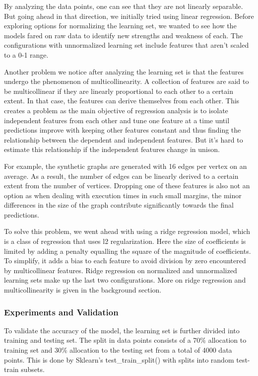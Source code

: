 By analyzing the data points, one can see that they are not linearly separable. But going ahead in that direction, we initially tried using linear regression. Before exploring options for normalizing the learning set, we wanted to see how the models fared on raw data to identify new strengths and weakness of each. The configurations with unnormalized learning set include features that aren't scaled to a 0-1 range.

Another problem we notice after analyzing the learning set is that the features undergo the phenomenon of multicollinearity. A collection of features are said to be multicollinear if they are linearly proportional to each other to a certain extent. In that case, the features can derive themselves from each other. This creates a problem as the main objective of regression analysis is to isolate independent features from each other and tune one feature at a time until predictions improve with keeping other features constant and thus finding the relationship between the dependent and independent features. But it's hard to estimate this relationship if the independent features change in unison. 


For example, the synthetic graphs are generated with 16 edges per vertex on an average. As a result, the number of edges can be linearly derived to a certain extent from the number of vertices. Dropping one of these features is also not an option as when dealing with execution times in such small margins, the minor differences in the size of the graph contribute significantly towards the final predictions.

To solve this problem, we went ahead with using a ridge regression model, which is a class of regression that uses l2 regularization. Here the size of coefficients is limited by adding a penalty equalling the square of the magnitude of coefficients. To simplify, it adds a bias to each feature to avoid division by zero encountered by multicollinear features. Ridge regression on normalized and unnormalized learning sets make up the last two configurations. More on ridge regression and multicollinearity is given in the background section.

\subsubsection{Experiments and Validation}
To validate the accuracy of the model, the learning set is further divided into training and testing set. The split in data points consists of a 70\% allocation to training set and 30\% allocation to the testing set from a total of 4000 data points. This is done by Sklearn's test\_train\_split() with splits into random test-train subsets. 


